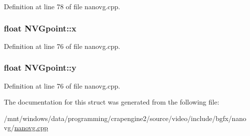 Definition at line 78 of file nanovg.\+cpp.

\hypertarget{struct_n_v_gpoint_a326d40b39869030b6c45b5b882be9fbb}{
\subsubsection[{x}]{\setlength{\rightskip}{0pt plus 5cm}float N\+V\+Gpoint\+::x}}\label{struct_n_v_gpoint_a326d40b39869030b6c45b5b882be9fbb}


Definition at line 76 of file nanovg.\+cpp.

\hypertarget{struct_n_v_gpoint_a40a1ffbc5c699987afffd14a8bb4741b}{
\subsubsection[{y}]{\setlength{\rightskip}{0pt plus 5cm}float N\+V\+Gpoint\+::y}}\label{struct_n_v_gpoint_a40a1ffbc5c699987afffd14a8bb4741b}


Definition at line 76 of file nanovg.\+cpp.



The documentation for this struct was generated from the following file\+:\begin{DoxyCompactItemize}
\item 
/mnt/windows/data/programming/crapengine2/source/video/include/bgfx/nanovg/\hyperlink{nanovg_8cpp}{nanovg.\+cpp}\end{DoxyCompactItemize}

